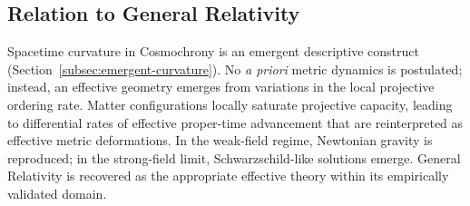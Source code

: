 \subsection{Relation to General Relativity}
  \label{subsec:relation-to-general-relativity}

  Spacetime curvature in Cosmochrony is an emergent descriptive construct
  (Section~\ref{subsec:emergent-curvature}).
  No \emph{a priori} metric dynamics is postulated; instead, an effective
  geometry emerges from variations in the local projective ordering rate.
  Matter configurations locally saturate projective capacity, leading to
  differential rates of effective proper-time advancement that are
  reinterpreted as effective metric deformations.
  In the weak-field regime, Newtonian gravity is reproduced; in the
  strong-field limit, Schwarzschild-like solutions emerge.
  General Relativity is recovered as the appropriate effective theory
  within its empirically validated domain.
